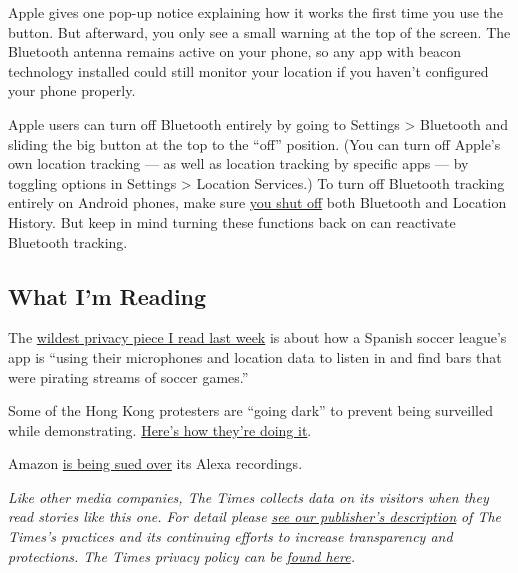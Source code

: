 Apple gives one pop-up notice explaining how it works the first time you
use the button. But afterward, you only see a small warning at the top
of the screen. The Bluetooth antenna remains active on your phone, so
any app with beacon technology installed could still monitor your
location if you haven't configured your phone properly.

Apple users can turn off Bluetooth entirely by going to Settings
\textgreater{} Bluetooth and sliding the big button at the top to the
``off'' position. (You can turn off Apple's own location tracking --- as
well as location tracking by specific apps --- by toggling options in
Settings \textgreater{} Location Services.) To turn off Bluetooth
tracking entirely on Android phones, make sure
\href{https://qz.com/1169760/phone-data/}{you shut off} both Bluetooth
and Location History. But keep in mind turning these functions back on
can reactivate Bluetooth tracking.

\hypertarget{what-im-reading}{%
\subsection{What I'm Reading}\label{what-im-reading}}

The
\href{http://nymag.com/intelligencer/2019/06/laliga-app-spied-on-users-earning-soccer-league-a-fine.html}{wildest
privacy piece I read last week} is about how a Spanish soccer league's
app is ``using their microphones and location data to listen in and find
bars that were pirating streams of soccer games.''

Some of the Hong Kong protesters are ``going dark'' to prevent being
surveilled while demonstrating.
\href{https://www.france24.com/en/20190613-surveillance-savvy-hong-kong-protesters-go-digitally-dark}{Here's
how they're doing it}.

Amazon
\href{https://twitter.com/seattletimes/status/1139161749909901312}{is
being sued over} its Alexa recordings.

\emph{Like other media companies, The Times collects data on its
visitors when they read stories like this one. For detail please}
\href{https://www.nytimes.com/2019/04/10/opinion/sulzberger-new-york-times-privacy.html?rref=collection\%2Fspotlightcollection\%2Fprivacy-project-does-privacy-matter\&action=click\&contentCollection=opinion\&region=stream\&module=stream_unit\&version=latest\&contentPlacement=8\&pgtype=collection}{\emph{see
our publisher's description}} \emph{of The Times's practices and its
continuing efforts to increase transparency and protections. The Times
privacy policy can be}
\href{https://help.nytimes.com/hc/en-us/articles/115014892108-Privacy-policy}{\emph{found
here}}\emph{.}

